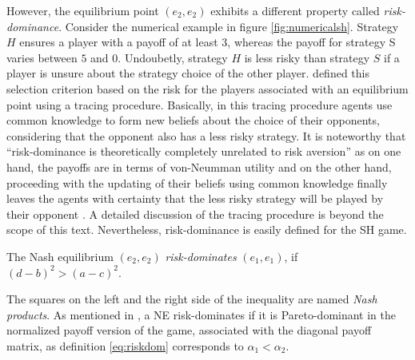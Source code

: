 However, the equilibrium point $(e_2,e_2)$ exhibits a different property
called \textit{risk-dominance}. 
Consider the numerical example in figure \ref{fig:numericalsh}. 
Strategy $H$ ensures a player with a payoff of at least $3$, whereas the 
payoff for strategy S varies between $5$ and $0$. Undoubetly, 
strategy $H$ is less risky than strategy $S$ if a player is unsure 
about the strategy choice of the other player.
\textcite{harsanyi_general_1988} defined this selection criterion 
based on the risk for the players associated with an 
equilibrium point using a tracing procedure. 
Basically, in this tracing procedure agents use common knowledge
to form new beliefs about the choice of their opponents, considering that
the opponent also has a less risky strategy.
It is noteworthy that ``risk-dominance is theoretically completely unrelated
to risk aversion'' as on one hand, the payoffs are in terms of von-Neumman
utility and on the other hand, proceeding with the updating of their beliefs
using common knowledge finally leaves the agents with certainty that the less 
risky strategy will be played by their opponent 
\parencite[341]{straub_risk_1995}.
A detailed discussion of the tracing procedure is beyond the scope of this
text. Nevertheless, risk-dominance is easily defined for the SH game.
\begin{mydef}
 \label{eq:riskdom}
The Nash equilibrium $(e_2,e_2)$ \textit{risk-dominates} 
$(e_1,e_1)$, if $(d-b)^2 > (a-c)^2$. \end{mydef}
The squares on the left and the right side of the inequality are named
\textit{Nash products}.
As mentioned in \textcite{weibull_evolutionary_1997}, a NE risk-dominates 
if it is Pareto-dominant in the normalized payoff version of the game, 
associated with the diagonal payoff matrix, 
as definition \eqref{eq:riskdom} corresponds to $\alpha_1 < \alpha_2$.

